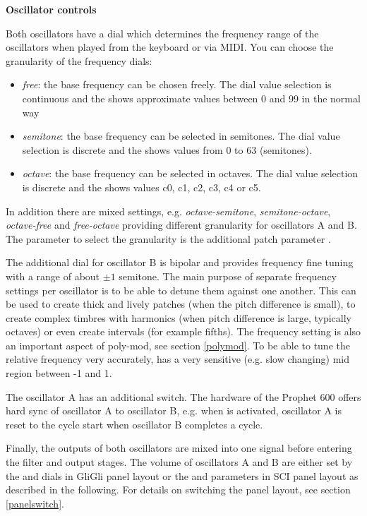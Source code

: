 \textbf{Oscillator controls}

Both oscillators have a \oscfreq dial which determines the frequency range of the oscillators when played from the keyboard or via MIDI.  You can choose the granularity of the frequency dials: 
\begin{itemize}
  \item \textit{free}: the base frequency can be chosen freely. The dial value selection is continuous and the \display shows approximate values between 0 and 99 in the normal way
  \item \textit{semitone}: the base frequency can be selected in semitones. The dial value selection is discrete and the \display shows values from 0 to 63 (semitones).   
  \item \textit{octave}: the base frequency can be selected in octaves. The dial value selection is discrete and the \display shows values c0, c1, c2, c3, c4 or c5. 
\end{itemize}  
In addition there are mixed settings, e.g. \textit{octave-semitone}, \textit{semitone-octave}, \textit{octave-free} and \textit{free-octave} providing different granularity for oscillators A and B. The parameter to select the granularity is the additional patch parameter \oscpitchmode. 

The additional \freqfine dial for oscillator B is bipolar and provides frequency fine tuning with a range of about $\pm 1$ semitone. The main purpose of separate frequency settings per oscillator is to be able to detune them against one another. This can be used to create thick and lively patches (when the pitch difference is small), to create complex timbres with harmonics (when pitch difference is large, typically octaves) or even create intervals (for example fifths). The frequency setting is also an important aspect of poly-mod, see section \ref{polymod}. To be able to tune the relative frequency very accurately, \freqfine has a very sensitive (e.g. slow changing) mid region between -1 and 1.

The oscillator A has an additional \oscsync switch. The hardware of the Prophet 600 offers hard sync of oscillator A to oscillator B, e.g. when \oscsync is activated, oscillator A is reset to the cycle start when oscillator B completes a cycle. 

Finally, the outputs of both oscillators are mixed into one signal before entering the filter and output stages. The volume of oscillators A and B are either set by the \vola and \volb dials in GliGli panel layout or the \mixer and \drive parameters in SCI panel layout as described in the following. For details on switching the panel layout, see section \ref{panelswitch}.

